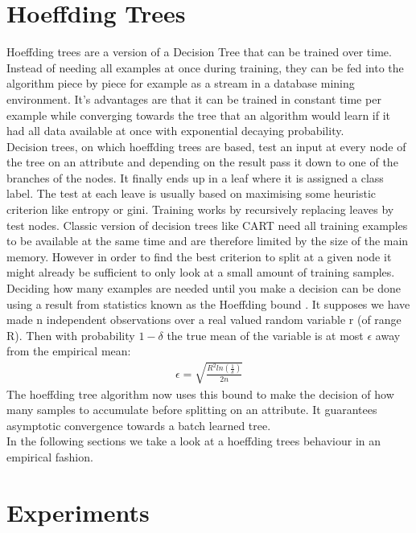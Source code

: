\documentclass[conference]{IEEEtran}
\begin{document}
\section{Hoeffding Trees}
\label{Trees}
Hoeffding trees \cite{b3} are a version of a Decision Tree that can be trained over time. Instead of needing all examples at once during training, they can be fed into the algorithm piece by piece for example as a stream in a database mining environment.
It's advantages are that it can be trained in constant time per example while converging towards the tree that an algorithm would learn if it had all data available at once with exponential decaying probability.\\
Decision trees, on which hoeffding trees are based, test an input at every node of the tree on an attribute and depending on the result pass it down to one of the branches of the nodes.
It finally ends up in a leaf where it is assigned a class label. 
The test at each leave is usually based on maximising some heuristic criterion like entropy or gini.
Training works by recursively replacing leaves by test nodes. 
Classic version of decision trees like CART \cite{b9} need all training examples to be available at the same time and are therefore limited by the size of the main memory.
However in order to find the best criterion to split at a given node it might already be sufficient to only look at a small amount of training samples. Deciding how many examples are needed until you make a decision can be done using a result from statistics known as the Hoeffding bound \cite{b18}.
It supposes we have made n independent observations over a real valued random variable r (of range R).
Then with probability $ 1 - \delta $ the true mean of the variable is at most $\epsilon$ away from the empirical mean:
\begin{align}
\epsilon = \sqrt{\frac{R^2 ln(\frac{1}{\delta})}{2n}}
\end{align}
The hoeffding tree algorithm now uses this bound to make the decision of how many samples to accumulate before splitting on an attribute.
It guarantees asymptotic convergence towards a batch learned tree. \cite{b3}\\
In the following sections we take a look at a hoeffding trees behaviour in an empirical fashion.

\section{Experiments}
\label{Experiments}
\end{document}
